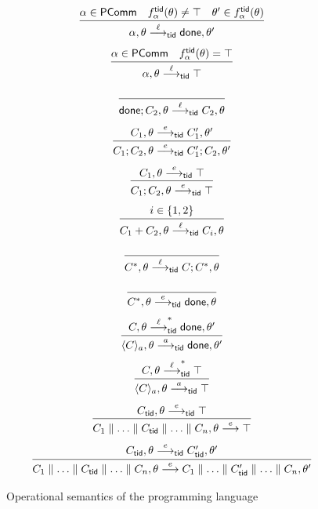 \begin{figure}[t]
\begin{gather*}
\infer{
 \alpha, \theta \stackrel{\ell}{\longrightarrow}_\ltid \done, \theta'
}{
  \alpha \in \PComm
 & 
 f^{\ltid}_ \alpha (\theta) \neq \top
 &
 \theta' \in f^{\ltid}_ \alpha(\theta) 
}
\\[3pt]
\infer{
  \alpha, \theta \stackrel{\ell}{\longrightarrow}_\ltid \top
}{
  \alpha \in \PComm
 & 
 f^{\ltid}_ \alpha (\theta) = \top
}
\\[10pt]
\infer{
  \done; C_2, \theta \stackrel{\ell}{\longrightarrow}_\ltid C_2, \theta
}{}
\\[3pt]
\infer{
  C_1; C_2, \theta \stackrel{e}{\longrightarrow}_\ltid C'_1; C_2, \theta'
}{
  C_1, \theta \stackrel{e}{\longrightarrow}_\ltid C'_1, \theta'
}
\\[3pt]
\infer{
  C_1; C_2, \theta \stackrel{e}{\longrightarrow}_\ltid \top
}{
  C_1, \theta \stackrel{e}{\longrightarrow}_\ltid \top
}
\\[3pt]
\infer{
  C_1+C_2, \theta \stackrel{\ell}{\longrightarrow}_\ltid C_i, \theta
}{i \in \{1,2\}}
\\[10pt]
\infer{
  C^*, \theta \stackrel{\ell}{\longrightarrow}_\ltid C; C^*, \theta
}{}
\\[10pt]
\infer{
  C^*, \theta \stackrel{e}{\longrightarrow}_\ltid \done, \theta
}{}
\\[3pt]
\infer{\langle C \rangle_a, \theta \stackrel{a}{\longrightarrow}_\ltid \done,\theta'}
{C, \theta \stackrel{\ell}{\longrightarrow}_\ltid^* \done,\theta'}
\\[3pt]
\infer{\langle C \rangle_a, \theta \stackrel{a}{\longrightarrow}_\ltid \top}
{C, \theta \stackrel{\ell}{\longrightarrow}_\ltid^* \top}
\\[3pt]
\infer{
 C_1 \parallel \ldots \parallel C_\ltid \parallel \ldots \parallel C_n, \theta
 \stackrel{e}{\longrightarrow}
 \top
}{
 C_\ltid, \theta
 \stackrel{e}{\longrightarrow}_\ltid 
 \top
}
\\[3pt]
\infer {
 C_1 \parallel \ldots \parallel C_\ltid \parallel \ldots \parallel C_n, \theta
 \stackrel{e}{\longrightarrow}
 C_1 \parallel \ldots \parallel C'_\ltid \parallel \ldots \parallel C_n, \theta'
}{
 C_\ltid,\theta \stackrel{e}{\longrightarrow}_\ltid C'_\ltid, \theta'
}
\end{gather*}
\caption{\small Operational semantics of the programming language}
\label{fig:sem}
\end{figure}
